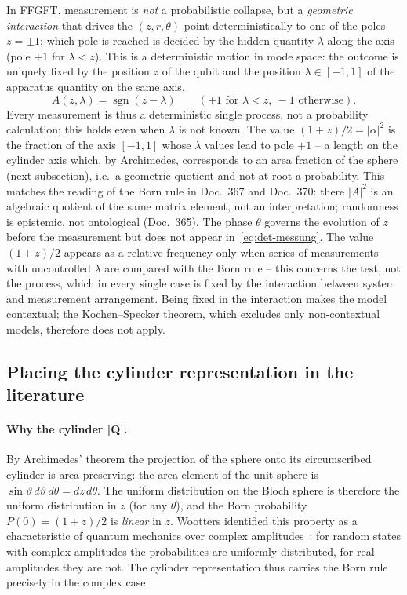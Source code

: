 In FFGFT, measurement is \emph{not} a probabilistic collapse, but a
\emph{geometric interaction} that drives the $(z, r, \theta)$ point
deterministically to one of the poles $z = \pm 1$; which pole is
reached is decided by the hidden quantity $\lambda$ along the axis
(pole $+1$ for $\lambda < z$). This is a deterministic motion in mode
space: the outcome is uniquely fixed by
the position $z$ of the qubit and the position $\lambda \in [-1,1]$ of
the apparatus quantity on the same axis,
\begin{equation}
  A(z,\lambda) = \operatorname{sgn}(z - \lambda)
  \qquad (+1 \text{ for } \lambda < z,\ -1 \text{ otherwise}).
  \label{eq:det-messung}
\end{equation}
Every measurement is thus a deterministic single process, not a
probability calculation; this holds even when $\lambda$ is not known.
The value $(1+z)/2 = |\alpha|^2$ is the fraction of the axis $[-1,1]$
whose $\lambda$ values lead to pole $+1$ -- a length on the cylinder
axis which, by Archimedes, corresponds to an area fraction of the
sphere (next subsection), i.e.\ a geometric quotient and not at root a
probability. This matches the reading of the Born rule in Doc.~367 and
Doc.~370: there $|A|^2$ is an algebraic quotient of the same matrix
element, not an interpretation; randomness is epistemic, not
ontological (Doc.~365). The phase $\theta$ governs the evolution of
$z$ before the measurement but does not appear
in~\eqref{eq:det-messung}. The value $(1+z)/2$ appears as a relative
frequency only when series of measurements with uncontrolled $\lambda$
are compared with the Born rule -- this concerns the test, not the
process, which in every single case is fixed by the interaction
between system and measurement arrangement.
Being fixed in the interaction makes the model contextual; the
Kochen--Specker theorem, which excludes only non-contextual models,
therefore does not apply.

\subsection{Placing the cylinder representation in the literature}

\paragraph{Why the cylinder [Q].} By Archimedes' theorem the
projection of the sphere onto its circumscribed cylinder is
area-preserving: the area element of the unit sphere is
$\sin\vartheta\,d\vartheta\,d\theta = dz\,d\theta$. The uniform
distribution on the Bloch sphere is therefore the uniform distribution
in $z$ (for any $\theta$), and the Born probability
$P(0) = (1+z)/2$ is \emph{linear} in $z$. Wootters identified this
property as a characteristic of quantum mechanics over complex
amplitudes~\cite{wootters1990}: for random states with complex
amplitudes the probabilities are uniformly distributed, for real
amplitudes they are not. The cylinder representation thus carries the
Born rule precisely in the complex case.


